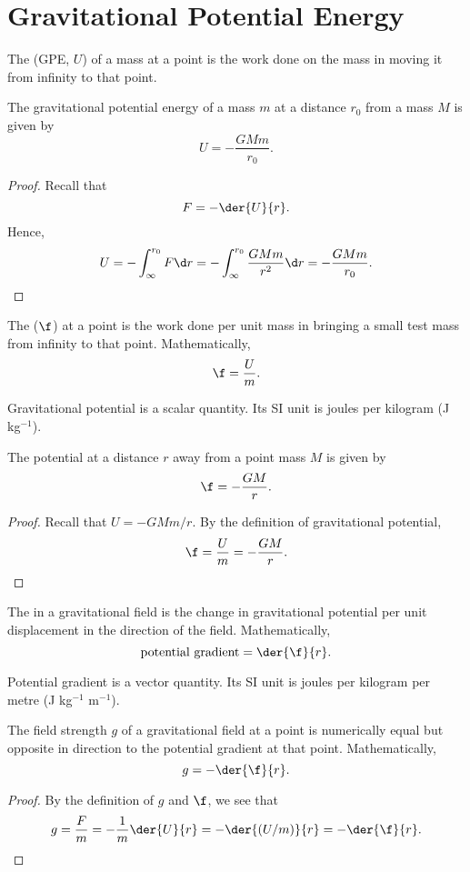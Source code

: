 \section{Gravitational Potential Energy}

\begin{definition}
    The  (GPE, $U$) of a mass at a point is the work done on the mass in moving it from infinity to that point.
\end{definition}

\begin{proposition}
    The gravitational potential energy of a mass $m$ at a distance $r_0$ from a mass $M$ is given by \[U = -\frac{GMm}{r_0}.\]
\end{proposition}
\begin{proof}
    Recall that \[F = -\der{U}{r}.\] Hence, \[U = -\int_{\infty}^{r_0} F \d r = -\int_\infty^{r_0} \frac{GMm}{r^2} \d r = -\frac{GMm}{r_0}.\]
\end{proof}

\begin{definition}
    The  ($\f$) at a point is the work done per unit mass in bringing a small test mass from infinity to that point. Mathematically, \[\f = \frac{U}{m}.\]
\end{definition}

Gravitational potential is a scalar quantity. Its SI unit is joules per kilogram (J kg$^{-1}$).

\begin{proposition}
    The potential at a distance $r$ away from a point mass $M$ is given by \[\f = -\frac{GM}{r}.\]
\end{proposition}
\begin{proof}
    Recall that $U = -GMm/r$. By the definition of gravitational potential, \[\f = \frac{U}{m} = -\frac{GM}{r}.\]
\end{proof}

\begin{definition}
    The  in a gravitational field is the change in gravitational potential per unit displacement in the direction of the field. Mathematically, \[\text{potential gradient} = \der{\f}{r}.\]
\end{definition}

Potential gradient is a vector quantity. Its SI unit is joules per kilogram per metre (J kg$^{-1}$ m$^{-1}$).

\begin{proposition}
    The field strength $g$ of a gravitational field at a point is numerically equal but opposite in direction to the potential gradient at that point. Mathematically, \[g = -\der{\f}{r}.\]
\end{proposition}
\begin{proof}
    By the definition of $g$ and $\f$, we see that \[g = \frac{F}{m} = - \frac1m \der{U}{r} = -\der{(U/m)}{r} = -\der{\f}{r}.\]
\end{proof}

